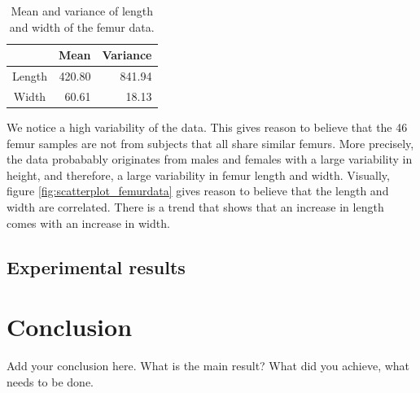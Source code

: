 \documentclass[10pt]{article}
\begin{document}
\begin{table}[h!]
\centering
\begin{tabular}{c|r|r}
 & Mean & Variance \\
\hline
Length & 420.80 & 841.94 \\
Width & 60.61 & 18.13
\end{tabular}
\caption{Mean and variance of length and width of the femur data.}
\label{table:mean_variance_femur_data}
\end{table}

\noindent
We notice a high variability of the data. This gives reason to believe that the 46 femur samples are not from subjects that all share similar femurs. More precisely, the data probabably originates from males and females with a large variability in height, and therefore, a large variability in femur length and width. Visually, figure \ref{fig:scatterplot_femurdata} gives reason to believe that the length and width are correlated. There is a trend that shows that an increase in length comes with an increase in width.





\newpage
\subsection{Experimental results}

\newpage
\section{Conclusion}

Add your conclusion here. What is the main result? What did you achieve, what 
needs to be done. 
\end{document}
